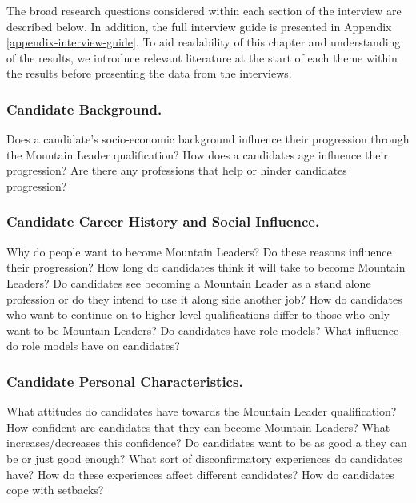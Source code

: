\documentclass[
  12pt,
  a4paper,
]{book}
\begin{document}
The broad research questions considered within each section of the interview are described below. In addition, the full interview guide is presented in Appendix \ref{appendix-interview-guide}. To aid readability of this chapter and understanding of the results, we introduce relevant literature at the start of each theme within the results before presenting the data from the interviews.

\hypertarget{candidate-background.}{%
\subsubsection{Candidate Background.}\label{candidate-background.}}

Does a candidate's socio-economic background influence their progression through the Mountain Leader qualification? How does a candidates age influence their progression? Are there any professions that help or hinder candidates progression?

\hypertarget{candidate-career-history-and-social-influence.}{%
\subsubsection{Candidate Career History and Social Influence.}\label{candidate-career-history-and-social-influence.}}

Why do people want to become Mountain Leaders? Do these reasons influence their progression? How long do candidates think it will take to become Mountain Leaders? Do candidates see becoming a Mountain Leader as a stand alone profession or do they intend to use it along side another job? How do candidates who want to continue on to higher-level qualifications differ to those who only want to be Mountain Leaders? Do candidates have role models? What influence do role models have on candidates?

\hypertarget{candidate-personal-characteristics.}{%
\subsubsection{Candidate Personal Characteristics.}\label{candidate-personal-characteristics.}}

What attitudes do candidates have towards the Mountain Leader qualification? How confident are candidates that they can become Mountain Leaders? What increases/decreases this confidence? Do candidates want to be as good a they can be or just good enough? What sort of disconfirmatory experiences do candidates have? How do these experiences affect different candidates? How do candidates cope with setbacks?
\end{document}
